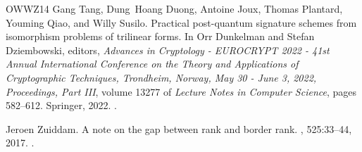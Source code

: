 \documentclass[10pt,a4paper]{article}
\theoremstyle{definition}
\begin{document}
\begin{thebibliography}{OWWZ14}
Gang Tang, Dung~Hoang Duong, Antoine Joux, Thomas Plantard, Youming Qiao, and
  Willy Susilo.
\newblock Practical post-quantum signature schemes from isomorphism problems of
  trilinear forms.
\newblock In Orr Dunkelman and Stefan Dziembowski, editors, {\em Advances in
  Cryptology - {EUROCRYPT} 2022 - 41st Annual International Conference on the
  Theory and Applications of Cryptographic Techniques, Trondheim, Norway, May
  30 - June 3, 2022, Proceedings, Part {III}}, volume 13277 of {\em Lecture
  Notes in Computer Science}, pages 582--612. Springer, 2022.
\newblock \href {https://doi.org/10.1007/978-3-031-07082-2\_21}
  {}.

Jeroen Zuiddam.
\newblock A note on the gap between rank and border rank.
, 525:33--44, 2017.
\newblock \href {https://doi.org/10.1016/j.laa.2017.03.015}
  {}.

\end{thebibliography}
\end{document}
